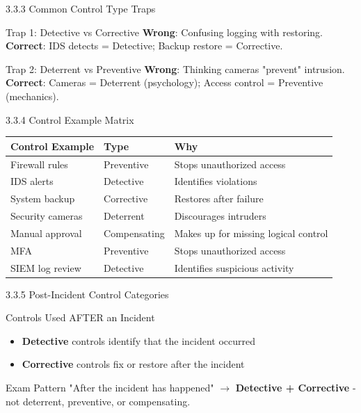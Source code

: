 \documentclass{beamer}
\begin{document}
	\begin{frame}{3.3.3 Common Control Type Traps}
		\begin{block}{Trap 1: Detective vs Corrective}
			\textbf{Wrong}: Confusing logging with restoring. \\
			\textbf{Correct}: IDS detects = Detective; Backup restore = Corrective.
		\end{block}
		\begin{block}{Trap 2: Deterrent vs Preventive}
			\textbf{Wrong}: Thinking cameras "prevent" intrusion. \\
			\textbf{Correct}: Cameras = Deterrent (psychology); Access control = Preventive (mechanics).
		\end{block}
	\end{frame}
	
	\begin{frame}{3.3.4 Control Example Matrix}
		\begin{table}
			\centering
			\begin{tabular}{|p{3cm}|p{4cm}|p{4cm}|}
				\hline
				\textbf{Control Example} & \textbf{Type} & \textbf{Why} \\
				\hline
				Firewall rules & Preventive & Stops unauthorized access \\
				\hline
				IDS alerts & Detective & Identifies violations \\
				\hline
				System backup & Corrective & Restores after failure \\
				\hline
				Security cameras & Deterrent & Discourages intruders \\
				\hline
				Manual approval & Compensating & Makes up for missing logical control \\
				\hline
				MFA & Preventive & Stops unauthorized access \\
				\hline
				SIEM log review & Detective & Identifies suspicious activity \\
				\hline
			\end{tabular}
		\end{table}
	\end{frame}
	
	\begin{frame}{3.3.5 Post-Incident Control Categories}
		\begin{block}{Controls Used AFTER an Incident}
			\begin{itemize}
				\item \textbf{Detective} controls identify that the incident occurred
				\item \textbf{Corrective} controls fix or restore after the incident
			\end{itemize}
		\end{block}
		\begin{alertblock}{Exam Pattern}
			"After the incident has happened" $\rightarrow$ \textbf{Detective + Corrective} - not deterrent, preventive, or compensating.
		\end{alertblock}
	\end{frame}
	
\end{document}
